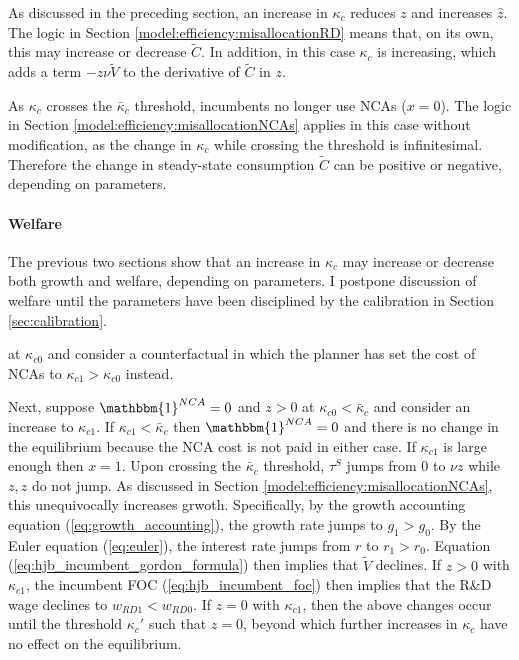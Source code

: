 As discussed in the preceding section, an increase in $\kappa_c$ reduces $z$ and increases $\hat{z}$. The logic in Section \ref{model:efficiency:misallocationRD} means that, on its own, this may increase or decrease $\tilde{C}$. In addition, in this case $\kappa_c$ is increasing, which adds a term $- z\nu \tilde{V}$ to the derivative of $\tilde{C}$ in $z$. 

As $\kappa_c$ crosses the $\bar{\kappa}_c$ threshold, incumbents no longer use NCAs ($x = 0$). The logic in Section \ref{model:efficiency:misallocationNCAs} applies in this case without modification, as the change in $\kappa_c$ while crossing the threshold is infinitesimal. Therefore the change in steady-state consumption $\tilde{C}$ can be positive or negative, depending on parameters. 

\paragraph{Welfare}

The previous two sections show that an increase in $\kappa_c$ may increase or decrease both growth and welfare, depending on parameters. I postpone discussion of welfare until the parameters have been disciplined by the calibration in Section \ref{sec:calibration}.




at $\kappa_{c0}$ and consider a counterfactual in which the planner has set the cost of NCAs to $\kappa_{c1} > \kappa_{c0}$ instead. 



Next, suppose $\mathbbm{1}^{NCA} = 0$ and $z > 0$ at $\kappa_{c0} < \bar{\kappa}_c$ and consider an increase to $\kappa_{c1}$. If $\kappa_{c1} < \bar{\kappa}_c$ then $\mathbbm{1}^{NCA} = 0$ and there is no change in the equilibrium because the NCA cost is not paid in either case. If $\kappa_{c1}$ is large enough then $x = 1$. Upon crossing the $\bar{\kappa}_c$ threshold, $\tau^S$ jumps from $0$ to $\nu z$ while $z,\hat{z}$ do not jump. As discussed in Section \ref{model:efficiency:misallocationNCAs}, this unequivocally increases grwoth. Specifically, by the growth accounting equation (\ref{eq:growth_accounting}), the growth rate jumps to $g_1 > g_0$. By the Euler equation (\ref{eq:euler}), the interest rate jumps from $r$ to $r_1>r_0$. Equation (\ref{eq:hjb_incumbent_gordon_formula}) then implies that $\tilde{V}$ declines. If $z > 0$ with $\kappa_{c1}$, the incumbent FOC (\ref{eq:hjb_incumbent_foc}) then implies that the R\&D wage declines to $w_{RD1} < w_{RD0}$. If $z = 0$ with $\kappa_{c1}$, then the above changes occur until the threshold $\kappa_{c}'$ such that $z = 0$, beyond which further increases in $\kappa_c$ have no effect on the equilibrium. 

